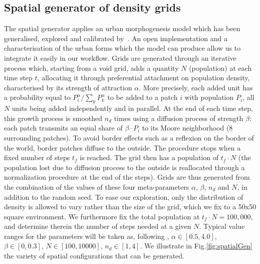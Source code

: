 \documentclass[3p,times,procedia]{elsarticle}
\begin{document}
\subsection{Spatial generator of density grids}

The spatial generator applies an urban morphogenesis model \citep{Batty2007} which has been generalised, explored and calibrated by~\citet{2017arXiv170806743R}. An open implementation and a characterisation of the urban forms which the model can produce allow us to integrate it easily in our workflow. Grids are generated through an iterative process which, starting from a void grid, adds a quantity $N$ (population) at each time step $t$, allocating it through preferential attachment on population density, characterised by its strength of attraction $\alpha$. More precisely, each added unit has a probability equal to $P_i^{\alpha}/\sum_k P_k^{\alpha}$ to be added to a patch $i$ with population $P_i$, all $N$ units being added independently and in parallel. At the end of each time step, this growth process is smoothed $n_d$ times using a diffusion process of strength $\beta$: each patch transmits an equal share of $\beta\cdot P_i$ to its Moore neighborhood (8 surrounding patches). To avoid border effects such as a reflexion on the border of the world, border patches diffuse to the outside. The procedure stops when a fixed number of steps $t_f$ is reached. The grid then has a population of $t_f \cdot N$ (the population lost due to diffusion process to the outside is reallocated through a normalization procedure at the end of the steps). Grids are thus generated from the combination of the values of these four meta-parameters $\alpha$, $\beta$, $n_d$ and $N$, in addition to the random seed. To ease our exploration, only the distribution of density is allowed to vary rather than the size of the grid, which we fix to a 50x50 square environment. We furthermore fix the total population at $t_f\cdot N = 100,000$, and determine therein the number of steps needed at a given $N$. Typical value ranges for the  parameters will be taken as, following \citet{2017arXiv170806743R}, $\alpha\in\left[0.5,4.0\right]$, $\beta \in\left[0,0.3\right] $, $N\in \left[100,10000\right]$, $n_d\in\left[1,4\right]$. We illustrate in Fig.\ref{fig:spatialGen} the variety of spatial configurations that can be generated.
\end{document}
